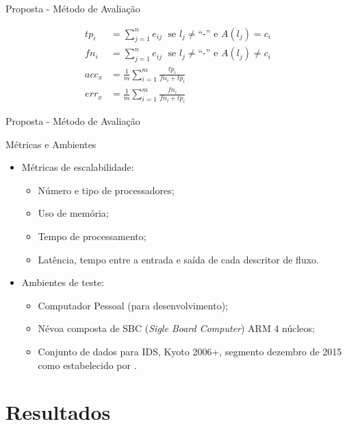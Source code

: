 \documentclass[aspectratio=1610,10pt]{beamer}
\begin{document}
\begin{frame}[fragile]{Proposta - Método de Avaliação}
{\hspace{0.5cm}
\begin{minipage}{.45\textwidth}
  \begin{align}
    tp_i &= \sum_{j=1}^{n} e_{ij} \; \text{ se } l_j \neq \text{``-''} \text{ e } A(l_j) = c_i\\
    fn_i &= \sum_{j=1}^{n} e_{ij} \; \text{ se } l_j \neq \text{``-''} \text{ e } A(l_j) \neq c_i\\
    \mathit{acc}_x &= \frac{1}{m} \sum_{i=1}^{m} \frac{tp_i}{fn_i + tp_i}\\
    \mathit{err}_x &= \frac{1}{m} \sum_{i=1}^{m} \frac{fn_i}{fn_i + tp_i}%
  \end{align}%
\end{minipage}
}
\end{frame}

\begin{frame}[fragile]{Proposta - Método de Avaliação}
  \begin{alertblock}{Métricas e Ambientes}
    \begin{itemize}%
      \item Métricas de escalabilidade:
      \begin{itemize}
        \item Número e tipo de processadores;
        \item Uso de memória;
        \item Tempo de processamento;
        \item Latência, tempo entre a entrada e saída de cada descritor de fluxo.
      \end{itemize}
      \item Ambientes de teste:
      \begin{itemize}
        \item Computador Pessoal (para desenvolvimento);
        \item Névoa composta de SBC (\emph{Sigle Board Computer}) ARM 4 núcleos;
        \item Conjunto de dados para IDS, Kyoto 2006+, segmento dezembro de 2015
        como estabelecido por .
      \end{itemize}
    \end{itemize}
  \end{alertblock}
\end{frame}

\section{Resultados}
\end{document}
